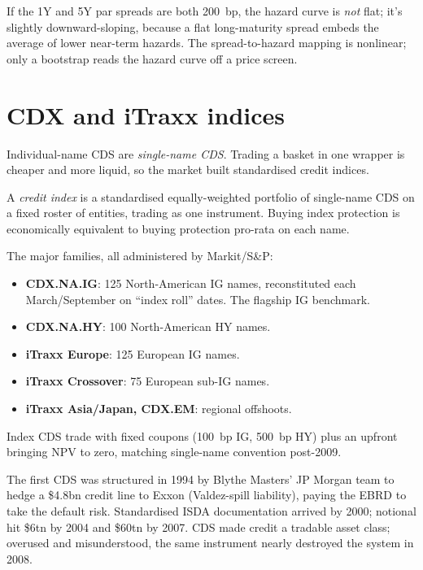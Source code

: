 \begin{pitfallbox}
If the 1Y and 5Y par spreads are both 200~bp, the hazard curve is
\emph{not} flat; it's slightly downward-sloping, because a flat
long-maturity spread embeds the average of lower near-term hazards.
The spread-to-hazard mapping is nonlinear; only a bootstrap reads
the hazard curve off a price screen.
\end{pitfallbox}


\section{CDX and iTraxx indices}
\label{sec:cdx}

Individual-name CDS are \emph{single-name CDS}.  Trading a basket
in one wrapper is cheaper and more liquid, so the market built
standardised credit indices.

\begin{definition}
A \emph{credit index} is a standardised equally-weighted portfolio
of single-name CDS on a fixed roster of entities, trading as one
instrument.  Buying index protection is economically equivalent to
buying protection pro-rata on each name.
\end{definition}

The major families, all administered by Markit/S\&P:
\begin{itemize}
  \item \textbf{CDX.NA.IG}: 125 North-American IG names,
    reconstituted each March/September on ``index roll'' dates.
    The flagship IG benchmark.
  \item \textbf{CDX.NA.HY}: 100 North-American HY names.
  \item \textbf{iTraxx Europe}: 125 European IG names.
  \item \textbf{iTraxx Crossover}: 75 European sub-IG names.
  \item \textbf{iTraxx Asia/Japan, CDX.EM}: regional offshoots.
\end{itemize}

Index CDS trade with fixed coupons (100~bp IG, 500~bp HY) plus an
upfront bringing NPV to zero, matching single-name convention
post-2009.

\begin{historybox}[title={Birth of the CDS: JP Morgan 1994}]
The first CDS was structured in 1994 by Blythe Masters' JP Morgan
team to hedge a \$4.8bn credit line to Exxon (Valdez-spill
liability), paying the EBRD to take the default risk.  Standardised
ISDA documentation arrived by 2000; notional hit \$6tn by 2004 and
\$60tn by 2007.  CDS made credit a tradable asset class; overused
and misunderstood, the same instrument nearly destroyed the system
in 2008.
\end{historybox}

